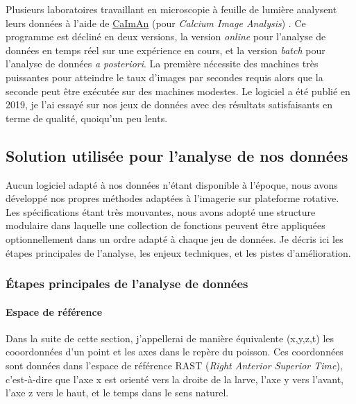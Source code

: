Plusieurs laboratoires travaillant en microscopie à feuille de lumière analysent leurs données à l'aide de \href{https://github.com/flatironinstitute/CaImAn}{CaImAn} (pour \emph{Calcium Image Analysis}) \cite{giovannucci_caiman_2019}. Ce programme est décliné en deux versions, la version \emph{online} pour l'analyse de données en temps réel sur une expérience en cours, et la version \emph{batch} pour l'analyse de données \emph{a posteriori}. La première nécessite des machines très puissantes pour atteindre le taux d'images par secondes requis alors que la seconde peut être exécutée sur des machines modestes. Le logiciel a été publié en 2019, je l'ai essayé sur nos jeux de données avec des résultats satisfaisants en terme de qualité, quoiqu'un peu lents.

\subsection{Solution utilisée pour l'analyse de nos données}


Aucun logiciel adapté à nos données n'étant disponible à l'époque, nous avons développé nos propres méthodes adaptées à l'imagerie sur plateforme rotative. Les spécifications étant très mouvantes, nous avons adopté une structure modulaire dans laquelle une collection de fonctions peuvent être appliquées optionnellement dans un ordre adapté à chaque jeu de données. Je décris ici les étapes principales de l'analyse, les enjeux techniques, et les pistes d'amélioration.

\subsubsection{Étapes principales de l'analyse de données}

\paragraph{Espace de référence}

Dans la suite de cette section, j'appellerai de manière équivalente (x,y,z,t) les cooordonnées d'un point et les axes dans le repère du poisson. Ces coordonnées sont données dans l'espace de référence RAST (\emph{Right Anterior Superior Time}), c'est-à-dire que l'axe x est orienté vers la droite de la larve, l'axe y vers l'avant, l'axe z vers le haut, et le temps dans le sens naturel.

